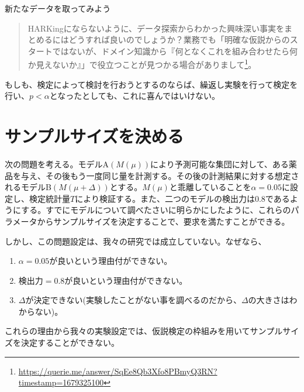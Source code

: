 \begin{SMbox}{新たなデータを取ってみよう}
  \begin{quote}    HARKingにならないように、データ探索からわかった興味深い事実をまとめるにはどうすれば良いのでしょうか？業務でも「明確な仮説からのスタートではないが、ドメイン知識から『何となくこれを組み合わせたら何か見えないか』」で役立つことが見つかる場合がありまして\footnote{\url{https://querie.me/answer/SqEe8Qb3Xfo8PBmyQ3RN?timestamp=1679325100}}。
  \end{quote}
  もしも、検定によって検討を行おうとするのならば、繰返し実験を行って検定を行い、$p<\alpha$となったとしても、これに喜んではいけない。
\end{SMbox}

\fi



\section{サンプルサイズを決める}
次の問題を考える。モデルA$(M(\mu))$により予測可能な集団に対して、ある薬品を与え、その後もう一度同じ量を計測する。その後の計測結果に対する想定されるモデルB$(M(\mu+\Delta))$とする。$M(\mu)$と乖離していることを$\alpha=0.05$に設定し、検定統計量$T$により検証する。また、二つのモデルの検出力は$0.8$であるようにする。すでにモデルについて調べたさいに明らかにしたように、これらのパラメータからサンプルサイズを決定することで、要求を満たすことができる。

しかし、この問題設定は、我々の研究では成立していない。なぜなら、
\begin{enumerate}
 \item $\alpha=0.05$が良いという理由付ができない。
 \item 検出力$=0.8$が良いという理由付ができない。
 \item $\Delta$が決定できない(実験したことがない事を調べるのだから、$\Delta$の大きさはわからない)。
\end{enumerate}
これらの理由から我々の実験設定では、仮説検定の枠組みを用いてサンプルサイズを決定することができない。

